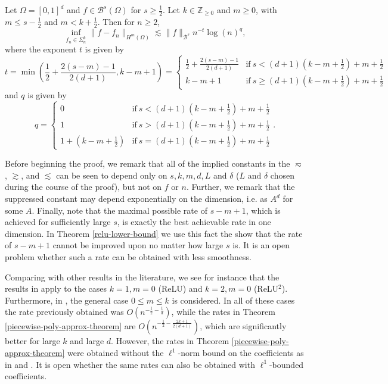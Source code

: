 \begin{theorem}\label{piecewise-poly-approx-theorem}
 Let $\Omega = [0,1]^d$ and $f\in \mathcal{B}^s(\Omega)$ for $s \geq \frac{1}{2}$. Let $k \in \mathbb{Z}_{\geq 0}$ and $m\geq 0$, with $m\leq s-\frac{1}{2}$ and $m < k + \frac{1}{2}$. Then for $n\geq 2$,
 \begin{equation}\label{bound-equation}
  \inf_{f_n\in \Sigma^k_{n}}\|f - f_n\|_{H^m(\Omega)} \lesssim \|f\|_{\mathcal{B}^s}n^{-t}\log(n)^q,
 \end{equation}
 where the exponent $t$ is given by
 $$t = \min\left(\frac{1}{2}+\frac{2(s-m)-1}{2(d+1)}, k-m+1\right) = \begin{cases}
            \frac{1}{2}+\frac{2(s-m)-1}{2(d+1)} & \text{if}~s < (d+1)\left(k-m+\frac{1}{2}\right) + m + \frac{1}{2} \\
            k-m+1 & \text{if}~s \geq (d+1)\left(k-m+\frac{1}{2}\right) + m + \frac{1}{2}
                                        \end{cases}
$$
 and $q$ is given by $$q = \begin{cases}
            0 & \text{if}~s < (d+1)\left(k-m+\frac{1}{2}\right) + m + \frac{1}{2} \\
            1 & \text{if}~s > (d+1)\left(k-m+\frac{1}{2}\right) + m + \frac{1}{2}\\
            1 + (k-m+\frac{1}{2}) & \text{if}~s = (d+1)\left(k-m+\frac{1}{2}\right) + m + \frac{1}{2}
           \end{cases}.$$
\end{theorem}
Before beginning the proof, we remark that all of the implied constants in the $\eqsim$, $\gtrsim$, and $\lesssim$ can be seen to depend only on $s,k,m,d,L$ and $\delta$ ($L$ and $\delta$ chosen during the course of the proof), but not on $f$ or $n$. Further, we remark that the suppressed constant may depend exponentially on the dimension, i.e. as $A^d$ for some $A$. Finally, note that the maximal possible rate of $s-m+1$, which is achieved for sufficiently large $s$, is exactly the best achievable rate in one dimension. In Theorem \ref{relu-lower-bound} we use this fact the show that the rate of $s-m+1$ cannot be improved upon no matter how large $s$ is. It is an open problem whether such a rate can be obtained with less smoothness.

Comparing with other results in the literature, we see for instance that the results in \cite{klusowski2018approximation} apply to the cases $k=1,m=0$ (ReLU) and $k=2,m=0$ (ReLU$^2$). Furthermore, in \cite{CiCP-28-1707}, the general case $0\leq m\leq k$ is considered. In all of these cases the rate previously obtained was $O(n^{-\frac{1}{2}-\frac{1}{d}})$, while the rates in Theorem \ref{piecewise-poly-approx-theorem} are $O(n^{-\frac{1}{2}-\frac{2k+1}{2(d+1)}})$, which are significantly better for large $k$ and large $d$. However, the rates in Theorem \ref{piecewise-poly-approx-theorem} were obtained without the $\ell^1$-norm bound on the coefficients as in \cite{klusowski2018approximation} and \cite{CiCP-28-1707}. It is open whether the same rates can also be obtained with $\ell^1$-bounded  coefficients.

